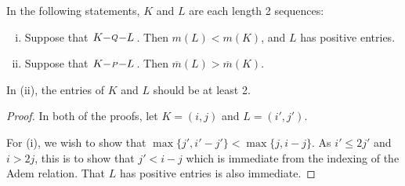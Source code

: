 \documentclass[10pt]{article}
\makeatletter
\newcommand{\produces}[3]{{#1}{#3}{#2}}
\renewcommand{\Q}{Q}
\newcommand{\SqShift}{\Sq_{+}}
\newcommand{\Sq}{\mathrm{Sq}}
\newcommand{\minDim}{m}
\newcommand{\minDimP}{\overline{m}}
\renewcommand{\produces}[3]{
{
\def\labelstyle{\scriptstyle}
\xymatrix@C=2em@1{
{#1}
\ar@{-}[r]|-{{\,#3\,}}
&%
{#2}%
}}}
\makeatother
\begin{document}
\begin{SteenrodAlgebrasAndTheirKoszulDuals}
\begin{lem}\label{lemOnAdemChangeInM}
In the following statements, $K$ and $L$ are each length 2 sequences:%
%
\begin{enumerate}[i)]
\setlength{\parindent}{.25in}
\item Suppose that $\produces{K}{L}{\Q}$. Then $\minDim(L)<\minDim(K)$, and $L$ has positive entries.
\item Suppose that $\produces{K}{L}{P}$. Then $\minDimP(L) > \minDimP(K)$.
\end{enumerate}
In (ii), the entries of $K$ and $L$ should be at least 2.
\end{lem}
\begin{proof}
In both of the proofs, let $K=(i,j)$ and $L=(i',j')$.

For (i), we wish to show that $\max\{j',i'-j'\}<\max\{j,i-j\}$. As $i'\leq 2j'$ and $i>2j$, this is to show that $j'<i-j$ which is immediate from the indexing of the Adem relation. That $L$ has positive entries is also immediate.


\end{proof}
\end{SteenrodAlgebrasAndTheirKoszulDuals}
\end{document}
